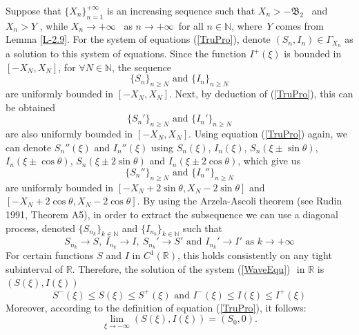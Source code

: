 \documentclass[final,3p,times]{elsarticle}
\numberwithin{equation}{section}
\begin{document}
Suppose that \(\{X_n\}_{n = 1}^{+\infty}\) is an increasing sequence such that \(X_n > -\mathfrak{B}_2\) ~and \(X_n > Y\) , while \(X_n \to +\infty\)~ as \(n \to +\infty\)~for all \(n \in \mathbb{N}\), where~\(Y\) comes from Lemma \ref{L-2.9}. For the system of equations (\ref{TruPro}), denote \((S_n, I_n) \in \Gamma_{X_n}\) as a solution to this system of equations. Since the function \(I^{+}(\xi)\) is bounded in \([-X_N, X_N]\), for  \(\forall N \in \mathbb{N}\), the sequence
\[
\{S_n\}_{n \geq N} \text{ and } \{I_n\}_{n \geq N}
\]
are  uniformly bounded in \([-X_N, X_N]\). Next, by deduction of (\ref{TruPro}), this can be obtained
\[
\{S_n'\}_{n \geq N} \text{ and } \{I_n'\}_{n \geq N}
\]
are also uniformly bounded in \([-X_N, X_N]\). Using equation (\ref{TruPro}) again, we can denote \(S_n''(\xi)\) and \(I_n''(\xi)\) using \(S_n(\xi)\), \(I_n(\xi)\), \(S_n(\xi \pm \sin\theta)\), \(I_n(\xi \pm \cos\theta)\), \(S_n(\xi \pm 2\sin\theta)\) and \(I_n(\xi \pm 2\cos\theta)\), which give us
\[
\{S_n''\}_{n \geq N} \text{ and } \{I_n''\}_{n \geq N}
\]
are uniformly bounded in \([-X_N + 2\sin\theta, X_N - 2\sin\theta]\) and \([-X_N + 2\cos\theta, X_N - 2\cos\theta]\). By using the Arzela-Ascoli theorem (see Rudin 1991, Theorem A5), in order to extract the subsequence we can use a diagonal process, denoted \(\{S_{n_k}\}_{k \in \mathbb{N}}\) and \(\{I_{n_k}\}_{k \in \mathbb{N}}\) such that
\[
S_{n_k} \to S,\ I_{n_k} \to I,\ S_{n_k}' \to S' \text{ and } I_{n_k}' \to I' \text{ as } k \to +\infty
\]
For certain functions \(S\) and \(I\) in \(C^{1}(\mathbb{R})\), this holds consistently on any tight subinterval of \(\mathbb{R}\). Therefore, the solution of the system (\ref{WaveEqu})  \(\text{ in } \mathbb{R}\) is  \((S(\xi), I(\xi))\)
\[
S^{-}(\xi) \leq S(\xi) \leq S^{+}(\xi) \text{ and } I^{-}(\xi) \leq I(\xi) \leq I^{+}(\xi) %
\]
Moreover, according to the definition of equation (\ref{TruPro}), it follows:
\[
\lim_{\xi \to -\infty}(S(\xi), I(\xi)) = (S_0, 0).
\]
\end{document}
